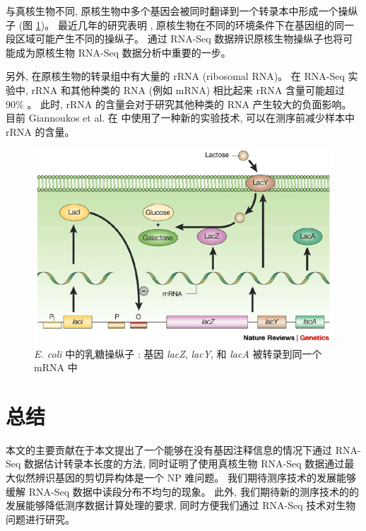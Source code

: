 与真核生物不同, 原核生物中多个基因会被同时翻译到一个转录本中形成一个操纵子 
(图 \ref{e.coli.lactose.operon})。 
最近几年的研究表明 \cite{MarcGuell11272009, koide2009prevalence}, 
原核生物在不同的环境条件下在基因组的同一段区域可能产生不同的操纵子。 
通过 RNA-Seq 数据辨识原核生物操纵子也将可能成为原核生物 RNA-Seq 数据分析中重要的一步。 

另外, 在原核生物的转录组中有大量的 rRNA (ribosomal RNA)。  
在 RNA-Seq 实验中, 
rRNA 和其他种类的 RNA (例如 mRNA) 相比起来 rRNA 含量可能超过 
90\% \cite{giannoukos2012efficient}。 
此时, rRNA 的含量会对于研究其他种类的 RNA 产生较大的负面影响。 
目前 Giannoukos et al. 在  中使用了一种新的实验技术, 
可以在测序前减少样本中 rRNA 的含量。 

\begin{figure}[!t]
\centering
\includegraphics[width=\textwidth]{figures/disc/e-coli-lactose-operon.png}
\caption[\textit{E. coli} 中的乳糖操纵子 \cite{shuman2003art}]
{\textit{E. coli} 中的乳糖操纵子 \cite{shuman2003art}: 
基因 \textit{lacZ}, \textit{lacY}, 和 \textit{lacA} 被转录到同一个 mRNA 中}
\label{e.coli.lactose.operon}
\end{figure}

\section{总结}
本文的主要贡献在于本文提出了一个能够在没有基因注释信息的情况下通过 RNA-Seq 数据估计转录本长度的方法, 
同时证明了使用真核生物 RNA-Seq 数据通过最大似然辨识基因的剪切异构体是一个 NP 难问题。
我们期待测序技术的发展能够缓解 RNA-Seq 数据中读段分布不均匀的现象。
此外, 我们期待新的测序技术的的发展能够降低测序数据计算处理的要求, 
同时方便我们通过 RNA-Seq 技术对生物问题进行研究。










